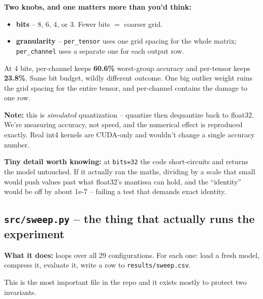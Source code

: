 \documentclass[11pt]{article}
\newcommand{\code}[1]{\texttt{\small #1}}
\begin{document}
\textbf{Two knobs, and one matters more than you'd think:}

\begin{itemize}[leftmargin=1.4em]
\item \textbf{bits} -- 8, 6, 4, or 3. Fewer bits $=$ coarser grid.
\item \textbf{granularity} -- \code{per\_tensor} uses one grid spacing for the
whole matrix; \code{per\_channel} uses a separate one for each output row.
\end{itemize}

\noindent At 4 bits, per-channel keeps \textbf{60.6\%} worst-group accuracy and
per-tensor keeps \textbf{23.8\%}. Same bit budget, wildly different outcome. One
big outlier weight ruins the grid spacing for the entire tensor, and per-channel
contains the damage to one row.

\textbf{Note:} this is \emph{simulated} quantization -- quantize then dequantize
back to float32. We're measuring accuracy, not speed, and the numerical effect is
reproduced exactly. Real int4 kernels are CUDA-only and wouldn't change a single
accuracy number.

\textbf{Tiny detail worth knowing:} at \code{bits=32} the code short-circuits and
returns the model untouched. If it actually ran the maths, dividing by a scale
that small would push values past what float32's mantissa can hold, and the
``identity'' would be off by about 1e-7 -- failing a test that demands exact
identity.

\subsection{\texttt{src/sweep.py} -- the thing that actually runs the experiment}

\textbf{What it does:} loops over all 29 configurations. For each one: load a
fresh model, compress it, evaluate it, write a row to \code{results/sweep.csv}.

This is the most important file in the repo and it exists mostly to protect two
invariants.

\begin{center}
\end{center}
\end{document}
